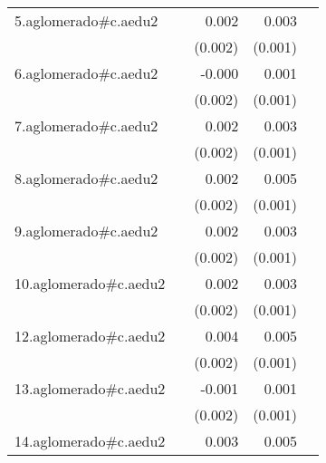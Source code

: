 {\begin{longtable}{l*{4}{D{.}{.}{-1}}}
\addlinespace
5.aglomerado#c.aedu2&                     &       0.002         &       0.003\sym{**} &                     \\
            &                     &     (0.002)         &     (0.001)         &                     \\
\addlinespace
6.aglomerado#c.aedu2&                     &      -0.000         &       0.001         &                     \\
            &                     &     (0.002)         &     (0.001)         &                     \\
\addlinespace
7.aglomerado#c.aedu2&                     &       0.002         &       0.003\sym{**} &                     \\
            &                     &     (0.002)         &     (0.001)         &                     \\
\addlinespace
8.aglomerado#c.aedu2&                     &       0.002         &       0.005\sym{***}&                     \\
            &                     &     (0.002)         &     (0.001)         &                     \\
\addlinespace
9.aglomerado#c.aedu2&                     &       0.002         &       0.003         &                     \\
            &                     &     (0.002)         &     (0.001)         &                     \\
\addlinespace
10.aglomerado#c.aedu2&                     &       0.002         &       0.003\sym{***}&                     \\
            &                     &     (0.002)         &     (0.001)         &                     \\
\addlinespace
12.aglomerado#c.aedu2&                     &       0.004\sym{*}  &       0.005\sym{***}&                     \\
            &                     &     (0.002)         &     (0.001)         &                     \\
\addlinespace
13.aglomerado#c.aedu2&                     &      -0.001         &       0.001         &                     \\
            &                     &     (0.002)         &     (0.001)         &                     \\
\addlinespace
14.aglomerado#c.aedu2&                     &       0.003         &       0.005\sym{***}&                     \\

\end{longtable}}
